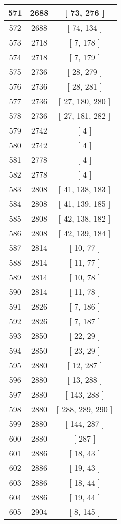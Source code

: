 \begin{center}
\begin{longtable}[H]{|| c c c ||}
\hline
571 & 2688 & [ 73, 276 ] \\ 
\hline
572 & 2688 & [ 74, 134 ] \\ 
\hline
573 & 2718 & [ 7, 178 ] \\ 
\hline
574 & 2718 & [ 7, 179 ] \\ 
\hline
575 & 2736 & [ 28, 279 ] \\ 
\hline
576 & 2736 & [ 28, 281 ] \\ 
\hline
577 & 2736 & [ 27, 180, 280 ] \\ 
\hline
578 & 2736 & [ 27, 181, 282 ] \\ 
\hline
579 & 2742 & [ 4 ] \\ 
\hline
580 & 2742 & [ 4 ] \\ 
\hline
581 & 2778 & [ 4 ] \\ 
\hline
582 & 2778 & [ 4 ] \\ 
\hline
583 & 2808 & [ 41, 138, 183 ] \\ 
\hline
584 & 2808 & [ 41, 139, 185 ] \\ 
\hline
585 & 2808 & [ 42, 138, 182 ] \\ 
\hline
586 & 2808 & [ 42, 139, 184 ] \\ 
\hline
587 & 2814 & [ 10, 77 ] \\ 
\hline
588 & 2814 & [ 11, 77 ] \\ 
\hline
589 & 2814 & [ 10, 78 ] \\ 
\hline
590 & 2814 & [ 11, 78 ] \\ 
\hline
591 & 2826 & [ 7, 186 ] \\ 
\hline
592 & 2826 & [ 7, 187 ] \\ 
\hline
593 & 2850 & [ 22, 29 ] \\ 
\hline
594 & 2850 & [ 23, 29 ] \\ 
\hline
595 & 2880 & [ 12, 287 ] \\ 
\hline
596 & 2880 & [ 13, 288 ] \\ 
\hline
597 & 2880 & [ 143, 288 ] \\ 
\hline
598 & 2880 & [ 288, 289, 290 ] \\ 
\hline
599 & 2880 & [ 144, 287 ] \\ 
\hline
600 & 2880 & [ 287 ] \\ 
\hline
601 & 2886 & [ 18, 43 ] \\ 
\hline
602 & 2886 & [ 19, 43 ] \\ 
\hline
603 & 2886 & [ 18, 44 ] \\ 
\hline
604 & 2886 & [ 19, 44 ] \\ 
\hline
605 & 2904 & [ 8, 145 ] \\ 

\end{longtable}
\end{center}
